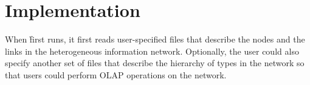 \section{Implementation}
\label{sec:impl}

When \h first runs, it first reads user-specified files that describe
the nodes and the links in the heterogeneous information network.
Optionally, the user could also specify another set of files that
describe the hierarchy of types in the network so that users could
perform OLAP operations on the network.
